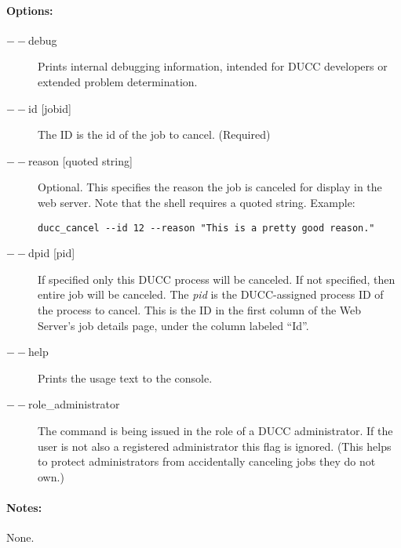     \paragraph{Options:}
    \begin{description}
        \item[$--$debug ]          
          Prints internal debugging information, intended for DUCC developers or extended problem determination.                    
        \item[$--$id {[jobid]}]
          The ID is the id of the job to cancel. (Required)
        \item[$--$reason {[quoted string]}]
          Optional. This specifies the reason the job is canceled for display in the web server. Note that
          the shell requires a quoted string.  Example:
\begin{verbatim}
ducc_cancel --id 12 --reason "This is a pretty good reason."
\end{verbatim}
        \item[$--$dpid {[pid]}]
          If specified only this DUCC process will be canceled.  If not
          specified, then entire job will be canceled.  The {\em pid} is the DUCC-assigned process ID of the
          process to cancel.  This is the ID in the first column of the Web Server's job details page, under
          the column labeled ``Id''.
        \item[$--$help]
          Prints the usage text to the console. 
        \item[$--$role\_administrator] The command is being issued in the role of a DUCC administrator.
          If the user is not also a registered administrator this flag is ignored.  (This helps to
          protect administrators from accidentally canceling jobs they do not own.)
     \end{description}
        
    \paragraph{Notes:}
    None.


